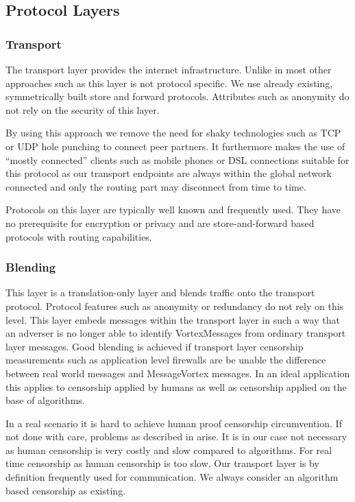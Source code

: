 \documentclass[9pt,journal,compsoc]{IEEEtran}
\begin{document}
\subsection{Protocol Layers}
\subsubsection{Transport}
The transport layer provides the internet infrastructure. Unlike in most other approaches such as \cite{tor-design,sherwood-protocol,freenet} this layer is not protocol specific. We use already existing, symmetrically built store and forward protocols. Attributes such as anonymity do not rely on the security of this layer.

By using this approach we remove the need for shaky technologies such as TCP or UDP hole punching to connect peer partners. It furthermore makes the use of ``mostly connected'' clients such as mobile phones or DSL connections suitable for this protocol as our transport endpoints are always within the global network connected and only the routing part may disconnect from time to time. 

Protocols on this layer are typically well known and frequently used. They have no prerequisite for encryption or privacy and are store-and-forward based protocols with routing capabilities. 

\subsubsection{Blending}
This layer is a translation-only layer and blends traffic onto the transport protocol. Protocol features such as anonymity or redundancy do not rely on this level. This layer embeds messages within the transport layer in such a way that an adverser is no longer able to identify VortexMessages from ordinary transport layer messages. Good blending is achieved if transport layer censorship measurements such as application level firewalls are be unable the difference between real world messages and MessageVortex messages. In an ideal application this applies to censorship applied by humans as well as censorship applied on the base of algorithms. 

In a real scenario it is hard to achieve human proof censorship circumvention. If not done with care, problems as described in \cite{abadi2005moderately} arise. It is in our case not necessary as human censorship is very costly and slow compared to algorithms. For real time censorship as human censorship is too slow. Our transport layer is by definition frequently used for communication. We always consider an algorithm based censorship as existing.
\end{document}
